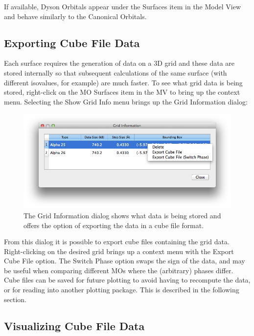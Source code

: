 \documentclass[a4paper,12pt]{article}
\begin{document}
If available, Dyson Orbitals appear under the Surfaces item in the Model View
and behave similarly to the Canonical Orbitals.





\subsection{Exporting Cube File Data}

Each surface requires the generation of data on a 3D grid and these data are
stored internally so that subsequent calculations of the same surface (with
different isovalues, for example) are much faster.  To see what grid data is
being stored, right-click on the MO Surfaces item in the MV to bring up the
context menu.  Selecting the Show Grid Info menu brings up the Grid Information
dialog:
\begin{figure}[h]
\begin{center}
\includegraphics[scale=0.4]{figures/GridInfo.png}
\caption{The Grid Information dialog shows what data is being stored and
offers the option of exporting the data in a cube file format.}
\end{center}
\end{figure}

From this dialog it is possible to export cube files containing the grid data.
Right-clicking on the desired grid brings up a context menu with the 
Export Cube File option.  The Switch Phase option swaps the sign of the data,
and may be useful when comparing different MOs where the (arbitrary) phases
differ.  Cube files can be saved for future plotting to avoid having to
recompute the data, or for reading into another plotting package.  This is
described in the following section.


\subsection{Visualizing Cube File Data}
\end{document}

